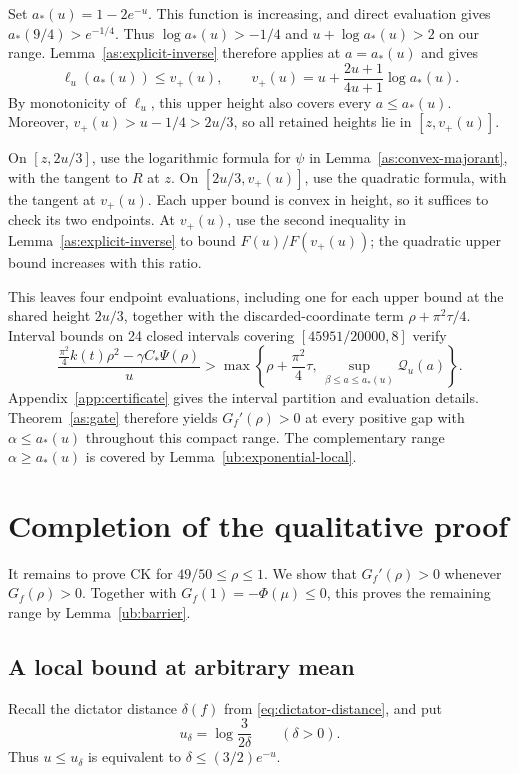 \documentclass[11pt,letterpaper]{amsart}
\newcommand{\1}{\mathbf 1}
\numberwithin{equation}{section}
\begin{document}
Set $a_*(u)=1-2e^{-u}$.
This function is increasing, and direct evaluation gives
$a_*(9/4)>e^{-1/4}$.
Thus $\log a_*(u)>-1/4$ and
$u+\log a_*(u)>2$ on our range.
Lemma~\ref{as:explicit-inverse} therefore applies at
$a=a_*(u)$ and gives
\[
 \ell_u(a_*(u))\le v_+(u),
 \qquad
 v_+(u)=u+\frac{2u+1}{4u+1}\log a_*(u).
\]
By monotonicity of $\ell_u$, this upper height also covers
every $a\le a_*(u)$.
Moreover,
$v_+(u)>u-1/4>2u/3$, so all retained heights lie in
$[z,v_+(u)]$.

On $[z,2u/3]$, use the logarithmic formula for $\psi$
in Lemma~\ref{as:convex-majorant}, with the tangent to $R$
at $z$.
On $[2u/3,v_+(u)]$, use the quadratic formula, with the
tangent at $v_+(u)$.
Each upper bound is convex in height, so it suffices to check
its two endpoints.
At $v_+(u)$, use the second inequality in
Lemma~\ref{as:explicit-inverse} to bound
$F(u)/F(v_+(u))$; the quadratic upper bound increases
with this ratio.

This leaves four endpoint evaluations, including one for each
upper bound at the shared height $2u/3$, together with the
discarded-coordinate term $\rho+\pi^2\tau/4$.
Interval bounds on 24 closed intervals covering
$[45951/20000,8]$ verify
\[
 \frac{\frac{\pi^2}{4}k(t)\rho^2-\gamma C_*\Psi(\rho)}{u}
 >
 \max\left\{
   \rho+\frac{\pi^2}{4}\tau,\,
   \sup_{\beta\le a\le a_*(u)}\mathcal Q_u(a)
 \right\}.
\]
Appendix~\ref{app:certificate} gives the interval partition
and evaluation details.
Theorem~\ref{as:gate} therefore yields $G_f'(\rho)>0$
at every positive gap with $\alpha\le a_*(u)$ throughout
this compact range.
The complementary range $\alpha\ge a_*(u)$ is covered by
Lemma~\ref{ub:exponential-local}.

\section{Completion of the qualitative proof}
\label{sec:qualitative-completion}

It remains to prove CK for $49/50\le\rho\le1$.
We show that $G_f'(\rho)>0$ whenever $G_f(\rho)>0$.
Together with $G_f(1)=-\Phi(\mu)\le0$, this proves the remaining
range by Lemma~\ref{ub:barrier}.

\subsection{A local bound at arbitrary mean}

Recall the dictator distance $\delta(f)$ from
\eqref{eq:dictator-distance}, and put
\begin{equation}\label{eq:local-thresholds}
 u_\delta=\log\frac{3}{2\delta}\qquad(\delta>0).
\end{equation}
Thus $u\le u_\delta$ is equivalent to
$\delta\le(3/2)e^{-u}$.
\end{document}
